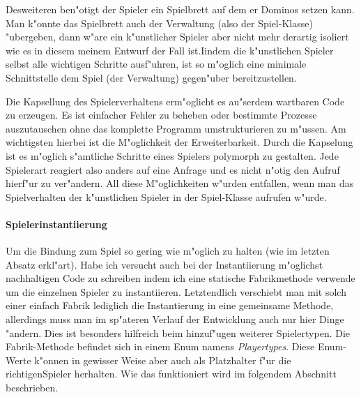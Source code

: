 Desweiteren ben"otigt der Spieler ein Spielbrett auf dem er Dominos setzen kann. Man k"onnte das Spielbrett auch der Verwaltung (also der Spiel-Klasse) "ubergeben, dann w"are ein k"unstlicher Spieler aber nicht mehr derartig isoliert wie es in diesem meinem Entwurf der Fall ist.Iindem die k"unstlichen Spieler selbst alle wichtigen Schritte ausf"uhren, ist so m"oglich eine minimale Schnittstelle dem Spiel (der Verwaltung) gegen"uber bereitzustellen. 

Die Kapsellung des Spielerverhaltens erm"oglicht es au"serdem wartbaren Code zu erzeugen. Es ist einfacher Fehler zu beheben oder bestimmte Prozesse auszutauschen ohne das komplette Programm umstrukturieren zu m"ussen. Am wichtigsten hierbei ist die M"oglichkeit der Erweiterbarkeit. Durch die Kapselung ist es m"oglich s"amtliche Schritte eines Spielers polymorph zu gestalten. Jede Spielerart reagiert also anders auf eine Anfrage und es nicht n"otig den Aufruf hierf"ur zu ver"andern. All diese M"oglichkeiten w"urden entfallen, wenn man das Spielverhalten der k"unstlichen Spieler in der Spiel-Klasse aufrufen w"urde.

\paragraph{Spielerinstantiierung}
Um die Bindung zum Spiel so gering wie m"oglich zu halten (wie im letzten Absatz erkl"art). Habe ich versucht auch bei der Instantiierung m"oglichst nachhaltigen Code zu schreiben indem ich eine statische Fabrikmethode verwende um die einzelnen Spieler zu instantiieren. Letztendlich verschiebt man mit solch einer einfach Fabrik lediglich die Instantierung in eine gemeinsame Methode, allerdings muss man im sp"ateren Verlauf der Entwicklung auch nur hier Dinge "andern. Dies ist besonders hilfreich beim hinzuf"ugen weiterer Spielertypen. Die Fabrik-Methode befindet sich in einem Enum namens \emph{Playertypes}. Diese Enum-Werte k"onnen in gewisser Weise aber auch als Platzhalter f"ur die \glqq richtigen\grqq  Spieler herhalten. Wie das funktioniert wird im folgendem Abschnitt beschrieben. 

